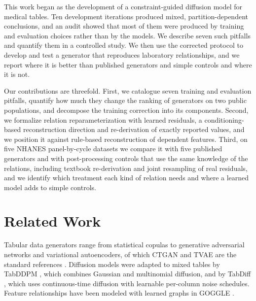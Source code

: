 \documentclass[conference]{IEEEtran}
\begin{document}
This work began as the development of a constraint-guided diffusion model for medical tables. Ten development iterations produced mixed, partition-dependent conclusions, and an audit showed that most of them were produced by training and evaluation choices rather than by the models. We describe seven such pitfalls and quantify them in a controlled study. We then use the corrected protocol to develop and test a generator that reproduces laboratory relationships, and we report where it is better than published generators and simple controls and where it is not.

Our contributions are threefold. First, we catalogue seven training and evaluation pitfalls, quantify how much they change the ranking of generators on two public populations, and decompose the training correction into its components. Second, we formalize relation reparameterization with learned residuals, a conditioning-based reconstruction direction and re-derivation of exactly reported values, and we position it against rule-based reconstruction of dependent features. Third, on five NHANES panel-by-cycle datasets we compare it with five published generators and with post-processing controls that use the same knowledge of the relations, including textbook re-derivation and joint resampling of real residuals, and we identify which treatment each kind of relation needs and where a learned model adds to simple controls.

\section{Related Work}

Tabular data generators range from statistical copulas to generative adversarial networks and variational autoencoders, of which CTGAN and TVAE are the standard references \cite{xu2019ctgan}. Diffusion models \cite{ho2020ddpm,austin2021d3pm} were adapted to mixed tables by TabDDPM \cite{kotelnikov2023tabddpm}, which combines Gaussian and multinomial diffusion, and by TabDiff \cite{shi2025tabdiff}, which uses continuous-time diffusion with learnable per-column noise schedules. Feature relationships have been modeled with learned graphs in GOGGLE \cite{liu2023goggle}.
\end{document}
